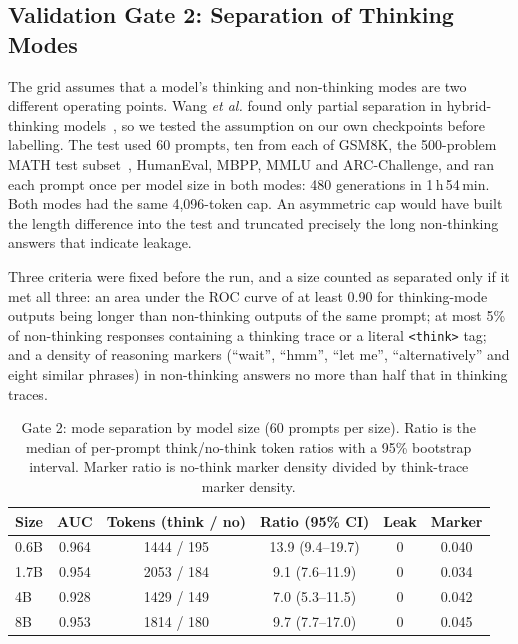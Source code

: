 \subsection{Validation Gate 2: Separation of Thinking Modes}
\label{sec:gate-mode}

The grid assumes that a model's thinking and non-thinking modes are two
different operating points. Wang \emph{et al.} found only partial separation
in hybrid-thinking models~\cite{wang2025demystifying}, so we tested the
assumption on our own checkpoints before labelling. The test used 60 prompts,
ten from each of GSM8K, the 500-problem MATH test subset~\cite{lightman2024verify}, HumanEval, MBPP, MMLU and
ARC-Challenge, and ran each prompt once per model size in both modes: 480
generations in 1\,h\,54\,min. Both modes had the same 4{,}096-token cap. An
asymmetric cap would have built the length difference into the test and
truncated precisely the long non-thinking answers that indicate leakage.

Three criteria were fixed before the run, and a size counted as separated
only if it met all three: an area under the ROC curve of at least 0.90 for
thinking-mode outputs being longer than non-thinking outputs of the same
prompt; at most 5\% of non-thinking responses containing a thinking trace
or a literal \texttt{\textless think\textgreater} tag; and a density of reasoning markers
(``wait'', ``hmm'', ``let me'', ``alternatively'' and eight similar phrases)
in non-thinking answers no more than half that in thinking traces.

\begin{table}[!t]
\centering
\caption{Gate 2: mode separation by model size (60 prompts per size).
Ratio is the median of per-prompt think/no-think token ratios with a 95\%
bootstrap interval. Marker ratio is no-think marker density divided by
think-trace marker density.}
\label{tab:gate2}
\renewcommand{\arraystretch}{1.1}
\setlength{\tabcolsep}{3.5pt}
\begin{tabular}{@{}l c c c c c@{}}
\toprule
Size & AUC & Tokens (think / no) & Ratio (95\% CI) & Leak & Marker \\
\midrule
0.6B & 0.964 & 1444 / 195 & 13.9 (9.4--19.7) & 0 & 0.040 \\
1.7B & 0.954 & 2053 / 184 & 9.1 (7.6--11.9)  & 0 & 0.034 \\
4B   & 0.928 & 1429 / 149 & 7.0 (5.3--11.5)  & 0 & 0.042 \\
8B   & 0.953 & 1814 / 180 & 9.7 (7.7--17.0)  & 0 & 0.045 \\
\bottomrule
\end{tabular}
\end{table}

